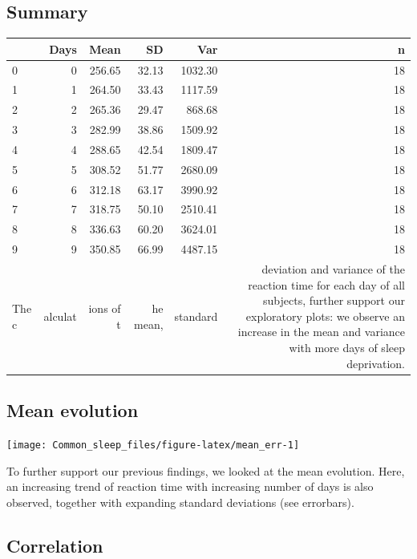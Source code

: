\documentclass[
]{article}
\begin{document}
\hypertarget{summary}{%
\subsection{Summary}\label{summary}}

\begin{longtable}[]{@{}lrrrrr@{}}
\toprule
& Days & Mean & SD & Var & n\tabularnewline
\midrule
\endhead
0 & 0 & 256.65 & 32.13 & 1032.30 & 18\tabularnewline
1 & 1 & 264.50 & 33.43 & 1117.59 & 18\tabularnewline
2 & 2 & 265.36 & 29.47 & 868.68 & 18\tabularnewline
3 & 3 & 282.99 & 38.86 & 1509.92 & 18\tabularnewline
4 & 4 & 288.65 & 42.54 & 1809.47 & 18\tabularnewline
5 & 5 & 308.52 & 51.77 & 2680.09 & 18\tabularnewline
6 & 6 & 312.18 & 63.17 & 3990.92 & 18\tabularnewline
7 & 7 & 318.75 & 50.10 & 2510.41 & 18\tabularnewline
8 & 8 & 336.63 & 60.20 & 3624.01 & 18\tabularnewline
9 & 9 & 350.85 & 66.99 & 4487.15 & 18\tabularnewline
The c & alculat & ions of t & he mean, & standard & deviation and
variance of the reaction time for each day of all subjects, further
support our exploratory plots: we observe an increase in the mean and
variance with more days of sleep deprivation.\tabularnewline
\bottomrule
\end{longtable}

\hypertarget{mean-evolution}{%
\subsection{Mean evolution}\label{mean-evolution}}

\begin{center}\texttt{[image: Common\_sleep\_files/figure-latex/mean\_err-1]} \end{center}

To further support our previous findings, we looked at the mean
evolution. Here, an increasing trend of reaction time with increasing
number of days is also observed, together with expanding standard
deviations (see errorbars).

\hypertarget{correlation}{%
\subsection{Correlation}\label{correlation}}
\end{document}
